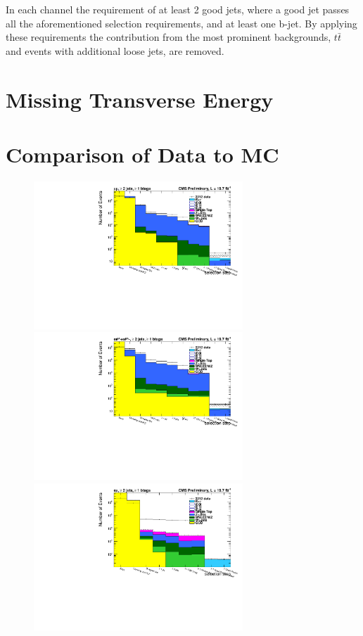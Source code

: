  In each channel the requirement of at least 2 good jets, where a good jet passes all the aforementioned selection requirements, and at least one b-jet. By applying these requirements the contribution from the most prominent backgrounds, $t\bar{t}$ and events with additional loose jets, are removed. 
 
\section{Missing Transverse Energy} \label{sec-METSelection}



\section{Comparison of Data to MC} \label{sec-dataMCcomparison}

\begin{figure}
\begin{center}
\includegraphics[width=0.7\textwidth]{Plots/CutFlow/Log/TTbarMuMuRefSelection.pdf}
\includegraphics[width=0.7\textwidth]{Plots/CutFlow/Log/TTbarEERefSelection.pdf}
\includegraphics[width=0.7\textwidth]{Plots/CutFlow/Log/TTbarEMuRefSelection.pdf}
\end{center}
\end{figure}

